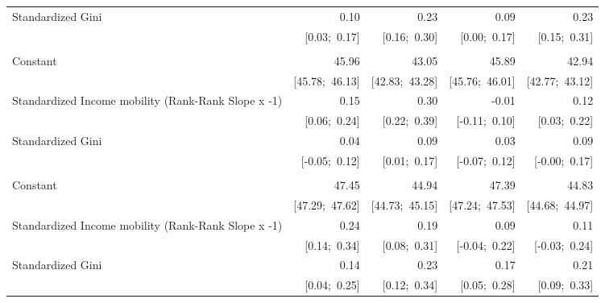 \begin{table}[htp]
\begin{threeparttable}
\begin{tabular}{l D{.}{.}{5.11} D{.}{.}{5.11} D{.}{.}{5.11} D{.}{.}{5.11} }
Standardized Gini                                   & 0.10            & 0.23            & 0.09            & 0.23            \\
                                                    & [0.03;\ 0.17]   & [0.16;\ 0.30]   & [0.00;\ 0.17]   & [0.15;\ 0.31]   \\
 \addlinespace[10pt]
 \\
\addlinespace[10pt]
 Constant                                            & 45.96           & 43.05           & 45.89           & 42.94           \\
                                                    & [45.78;\ 46.13] & [42.83;\ 43.28] & [45.76;\ 46.01] & [42.77;\ 43.12] \\
Standardized Income mobility (Rank-Rank Slope x -1) & 0.15            & 0.30            & -0.01           & 0.12            \\
                                                    & [0.06;\ 0.24]   & [0.22;\ 0.39]   & [-0.11;\ 0.10]  & [0.03;\ 0.22]   \\
Standardized Gini                                   & 0.04            & 0.09            & 0.03            & 0.09            \\
                                                    & [-0.05;\ 0.12]  & [0.01;\ 0.17]   & [-0.07;\ 0.12]  & [-0.00;\ 0.17]  \\
 \addlinespace[10pt]
 \\
\addlinespace[10pt]
 Constant                                            & 47.45           & 44.94           & 47.39           & 44.83           \\
                                                    & [47.29;\ 47.62] & [44.73;\ 45.15] & [47.24;\ 47.53] & [44.68;\ 44.97] \\
Standardized Income mobility (Rank-Rank Slope x -1) & 0.24            & 0.19            & 0.09            & 0.11            \\
                                                    & [0.14;\ 0.34]   & [0.08;\ 0.31]   & [-0.04;\ 0.22]  & [-0.03;\ 0.24]  \\
Standardized Gini                                   & 0.14            & 0.23            & 0.17            & 0.21            \\
                                                    & [0.04;\ 0.25]   & [0.12;\ 0.34]   & [0.05;\ 0.28]   & [0.09;\ 0.33]   \\

\end{tabular}
\end{threeparttable}
\end{table}
